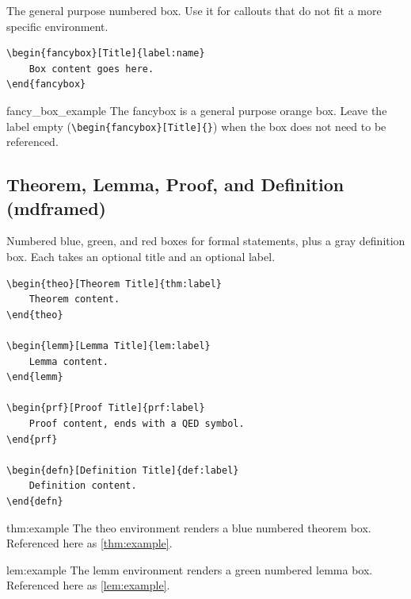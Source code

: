 The general purpose numbered box. Use it for callouts that do not fit a more specific environment.

\begin{lstlisting}[style=latexstyle]
\begin{fancybox}[Title]{label:name}
	Box content goes here.
\end{fancybox}
\end{lstlisting}

\begin{fancybox}{fancy_box_example}
	The fancybox is a general purpose orange box. Leave the label empty (\lstinline|\begin{fancybox}[Title]{}|) when the box does not need to be referenced.
\end{fancybox}

\subsection{Theorem, Lemma, Proof, and Definition (mdframed)}

Numbered blue, green, and red boxes for formal statements, plus a gray definition box. Each takes an optional title and an optional label.

\begin{lstlisting}[style=latexstyle]
\begin{theo}[Theorem Title]{thm:label}
	Theorem content.
\end{theo}

\begin{lemm}[Lemma Title]{lem:label}
	Lemma content.
\end{lemm}

\begin{prf}[Proof Title]{prf:label}
	Proof content, ends with a QED symbol.
\end{prf}

\begin{defn}[Definition Title]{def:label}
	Definition content.
\end{defn}
\end{lstlisting}

\begin{theo}{thm:example}
	The theo environment renders a blue numbered theorem box. Referenced here as \ref{thm:example}.
\end{theo}

\begin{lemm}{lem:example}
	The lemm environment renders a green numbered lemma box. Referenced here as \ref{lem:example}.
\end{lemm}

